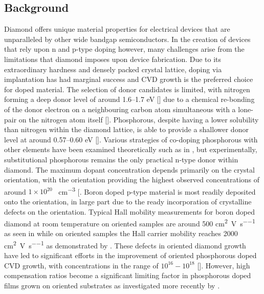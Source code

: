 \subsection{Background}
Diamond offers unique material properties for electrical devices that are unparalleled by other wide bandgap semiconductors. In the creation of devices that rely upon n and p-type doping however, many challenges arise from the limitations that diamond imposes upon device fabrication. Due to its extraordinary hardness and densely packed crystal lattice, doping via implantation has had marginal success and CVD growth is the preferred choice for doped material. The selection of donor candidates is limited, with nitrogen forming a deep donor level of around 1.6--1.7 \si{\electronvolt} [\cite{li1998}] due to a chemical re-bonding of the donor electron on a neighbouring carbon atom simultaneous with a lone-pair on the nitrogen atom itself [\cite{goss2008}]. Phosphorous, despite having a lower solubility than nitrogen within the diamond lattice, is able to provide a shallower donor level at around 0.57--0.60 \si{\electronvolt} [\cite{koizumi2000}]. Various strategies of co-doping phosphorous with other elements have been examined theoretically such as in \cite{alfieri2018}, but experimentally, substitutional phosphorous remains the only practical n-type donor within diamond. The maximum dopant concentration depends primarily on the crystal orientation, with the  orientation providing the highest observed concentrations of around $1\times10^{20}$ \si{\atoms\per\centi\metre\cubed} [\cite{grotjohn2014}. Boron doped p-type material is most readily deposited onto the  orientation, in large part due to the ready incorporation of crystalline defects on the  orientation. Typical Hall mobility measurements for boron doped diamond at room temperature on  oriented samples are around 500 \si{\cm\squared\per\volt\per\second} as seen in \cite{ri2005} while on  oriented samples the Hall carrier mobility reaches 2000 \si{\cm\squared\per\volt\per\second} as demonstrated by \cite{mortet2008}. These defects in  oriented diamond growth have led to significant efforts in the improvement of  oriented phosphorous doped CVD growth, with concentrations in the range of $10^{16}-10^{18}$ [\cite{kato2007}]. However, high compensation ratios become a significant limiting factor in phosphorous doped films grown on  oriented substrates as investigated more recently by \cite{stenger2021}.

